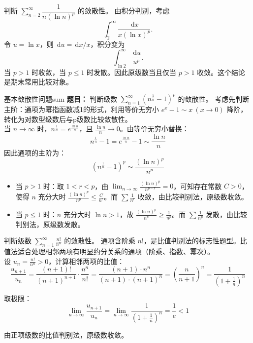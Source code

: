 \documentclass[UTF8,zihao=-4,openany]{ctexbook}
\newcommand{\dd}{\,\mathrm{d}}
\begin{document}
\begin{example}{}{}
判断 $\sum_{n=2}^{\infty}\dfrac{1}{n(\ln n)^p}$ 的敛散性。
\tcblower
由积分判别，考虑
\[
\int_2^\infty \frac{\dd x}{x(\ln x)^p}.
\]
令 $u=\ln x$，则 $\dd u=\dd x/x$，积分变为
\[
\int_{\ln2}^\infty \frac{\dd u}{u^p}.
\]
当 $p>1$ 时收敛，当 $p\le1$ 时发散。因此原级数当且仅当 $p>1$ 收敛。这个结论是期末常用比较对象。
\end{example}

\begin{example}{基本敛散性问题}{sum}
    \textbf{题目：} 判断级数 $\sum_{n=1}^\infty \left(n^{\frac{1}{n}} - 1\right)^p$ 的敛散性。
\tcblower
考虑先判断主阶：通项为幂指函数减1的形式，利用等价无穷小 $e^x - 1 \sim x \ (x \to 0)$ 降阶，转化为对数型级数后与p级数比较敛散性。\\
当 $n \to \infty$ 时，$n^{\frac{1}{n}} = e^{\frac{\ln n}{n}}$，且 $\frac{\ln n}{n} \to 0$。由等价无穷小替换：
$$
n^{\frac{1}{n}} - 1 = e^{\frac{\ln n}{n}} - 1 \sim \frac{\ln n}{n}
$$
因此通项的主阶为：
$$
\left(n^{\frac{1}{n}} - 1\right)^p \sim \frac{(\ln n)^p}{n^p}
$$

\begin{itemize}
    \item 当 $p > 1$ 时：取 $1 < r < p$，由 $\lim_{n\to\infty} \frac{(\ln n)^p}{n^{p-r}} = 0$，可知存在常数 $C>0$，使得 $n$ 充分大时 $\frac{(\ln n)^p}{n^p} \leq \frac{C}{n^r}$。而 $\sum \frac{1}{n^r}$ 收敛，由比较判别法，原级数收敛。
    \item 当 $p \leq 1$ 时：$n$ 充分大时 $\ln n > 1$，故 $\frac{(\ln n)^p}{n^p} \geq \frac{1}{n^p}$。而 $\sum \frac{1}{n^p}$ 发散，由比较判别法，原级数发散。
\end{itemize}
\end{example}

\begin{example}{}{}
判断级数 $\sum_{n=1}^\infty \frac{n!}{n^n}$ 的敛散性。
\tcblower
通项含阶乘 $n!$，是比值判别法的标志性题型。比值法适合处理相邻两项有明显约分关系的通项（阶乘、指数、幂次）。\\
设 $u_n = \frac{n!}{n^n} > 0$，计算相邻两项的比值：
$$
\frac{u_{n+1}}{u_n} = \frac{(n+1)!}{(n+1)^{n+1}} \cdot \frac{n^n}{n!} = \frac{(n+1)\cdot n^n}{(n+1)\cdot (n+1)^n} = \left( \frac{n}{n+1} \right)^n = \frac{1}{\left(1+\frac{1}{n}\right)^n}
$$

取极限：
$$
\lim_{n\to\infty} \frac{u_{n+1}}{u_n} = \lim_{n\to\infty} \frac{1}{\left(1+\frac{1}{n}\right)^n} = \frac{1}{e} < 1
$$

由正项级数的比值判别法，原级数收敛。
\end{example}
\end{document}
